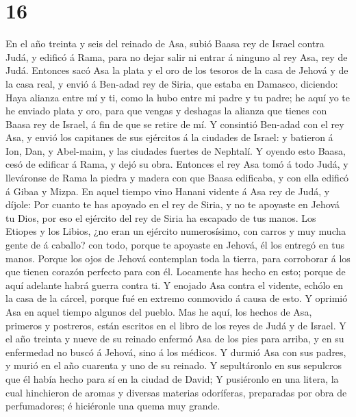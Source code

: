 \hypertarget{section-15}{%
\section{16}\label{section-15}}

 En el año treinta y seis del reinado de Asa, subió Baasa
rey de Israel contra Judá, y edificó á Rama, para no dejar salir ni
entrar á ninguno al rey Asa, rey de Judá.  Entonces sacó
Asa la plata y el oro de los tesoros de la casa de Jehová y de la casa
real, y envió á Ben-adad rey de Siria, que estaba en Damasco, diciendo:
 Haya alianza entre mí y ti, como la hubo entre mi padre y
tu padre; he aquí yo te he enviado plata y oro, para que vengas y
deshagas la alianza que tienes con Baasa rey de Israel, á fin de que se
retire de mí.  Y consintió Ben-adad con el rey Asa, y
envió los capitanes de sus ejércitos á la ciudades de Israel: y batieron
á Ion, Dan, y Abel-maim, y las ciudades fuertes de Nephtalí.
 Y oyendo esto Baasa, cesó de edificar á Rama, y dejó su
obra.  Entonces el rey Asa tomó á todo Judá, y lleváronse
de Rama la piedra y madera con que Baasa edificaba, y con ella edificó á
Gibaa y Mizpa.  En aquel tiempo vino Hanani vidente á Asa
rey de Judá, y díjole: Por cuanto te has apoyado en el rey de Siria, y
no te apoyaste en Jehová tu Dios, por eso el ejército del rey de Siria
ha escapado de tus manos.  Los Etiopes y los Libios, ¿no
eran un ejército numerosísimo, con carros y muy mucha gente de á
caballo? con todo, porque te apoyaste en Jehová, él los entregó en tus
manos.  Porque los ojos de Jehová contemplan toda la
tierra, para corroborar á los que tienen corazón perfecto para con él.
Locamente has hecho en esto; porque de aquí adelante habrá guerra contra
ti.  Y enojado Asa contra el vidente, echólo en la casa
de la cárcel, porque fué en extremo conmovido á causa de esto. Y oprimió
Asa en aquel tiempo algunos del pueblo.  Mas he aquí, los
hechos de Asa, primeros y postreros, están escritos en el libro de los
reyes de Judá y de Israel.  Y el año treinta y nueve de
su reinado enfermó Asa de los pies para arriba, y en su enfermedad no
buscó á Jehová, sino á los médicos.  Y durmió Asa con sus
padres, y murió en el año cuarenta y uno de su reinado. 
Y sepultáronlo en sus sepulcros que él había hecho para sí en la ciudad
de David; Y pusiéronlo en una litera, la cual hinchieron de aromas y
diversas materias odoríferas, preparadas por obra de perfumadores; é
hiciéronle una quema muy grande.

